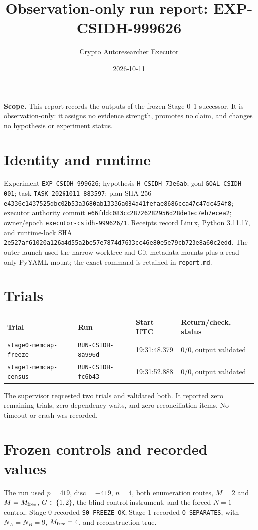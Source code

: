 \documentclass[11pt]{article}
\title{Observation-only run report: EXP-CSIDH-999626}
\author{Crypto Autoresearcher Executor}
\date{2026-10-11}
\begin{document}
\maketitle
\noindent\textbf{Scope.} This report records the outputs of the frozen Stage 0--1 successor. It is observation-only: it assigns no evidence strength, promotes no claim, and changes no hypothesis or experiment status.

\section*{Identity and runtime}
Experiment \texttt{EXP-CSIDH-999626}; hypothesis \texttt{H-CSIDH-73e6ab}; goal \texttt{GOAL-CSIDH-001}; task \texttt{TASK-20261011-883597}; plan SHA-256 \texttt{e4336c1437525dbc02b53a3680ab13336a084a41fefae8686cca47c47dc454f8}; executor authority commit \texttt{e66fddc083cc28726282956d28de1ec7eb7ecea2}; owner/epoch \texttt{executor-csidh-999626/1}. Receipts record Linux, Python 3.11.17, and runtime-lock SHA \texttt{2e527af61020a126a4d55a2be57e7874d7633cc46e80e5e79cb723e8a60c2edd}. The outer launch used the narrow worktree and Git-metadata mounts plus a read-only PyYAML mount; the exact command is retained in \texttt{report.md}.

\section*{Trials}
\begin{center}
\begin{tabular}{llll}
\toprule
Trial & Run & Start UTC & Return/check, status \\
\midrule
\texttt{stage0-memcap-freeze} & \texttt{RUN-CSIDH-8a996d} & 19:31:48.379 & 0/0, output validated \\
\texttt{stage1-memcap-census} & \texttt{RUN-CSIDH-fc6b43} & 19:31:52.888 & 0/0, output validated \\
\bottomrule
\end{tabular}
\end{center}

The supervisor requested two trials and validated both. It reported zero remaining trials, zero dependency waits, and zero reconciliation items. No timeout or crash was recorded.

\section*{Frozen controls and recorded values}
The run used $p=419$, $\mathrm{disc}=-419$, $n=4$, both enumeration routes, $M=2$ and $M=M_{\rm free}$, $G\in\{1,2\}$, the blind-control instrument, and the forced-$N=1$ control. Stage 0 recorded \texttt{S0-FREEZE-OK}; Stage 1 recorded \texttt{O-SEPARATES}, with $N_A=N_B=9$, $M_{\rm free}=4$, and reconstruction true.
\end{document}
